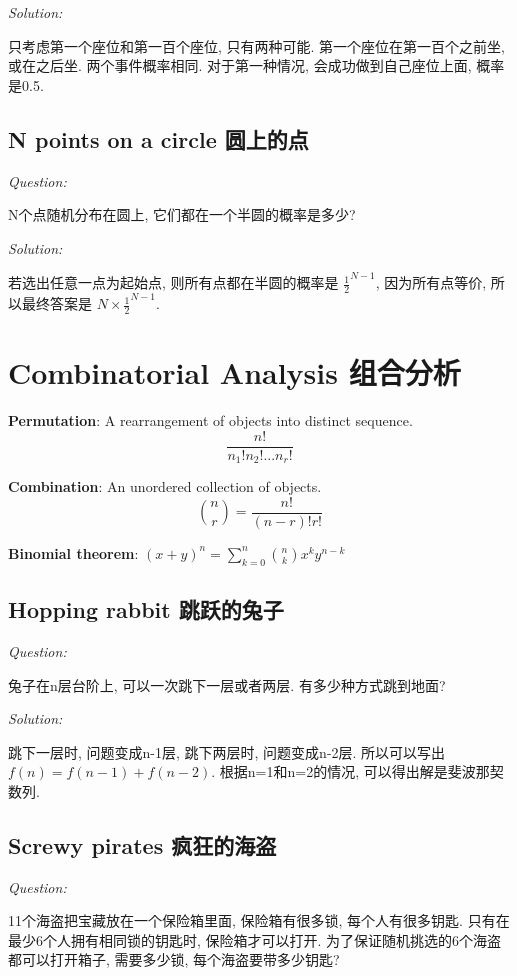 \documentclass[12pt]{book}
\begin{document}
 \noindent \textit{Solution:} 
 
 只考虑第一个座位和第一百个座位, 只有两种可能. 第一个座位在第一百个之前坐, 或在之后坐. 两个事件概率相同. 对于第一种情况, 会成功做到自己座位上面, 概率是0.5.
 
 \subsection{N points on a circle 圆上的点}
\noindent \textit{Question:}


N个点随机分布在圆上, 它们都在一个半圆的概率是多少?

 \noindent \textit{Solution:} 
 
 若选出任意一点为起始点, 则所有点都在半圆的概率是 $\frac{1}{2}^{N-1}$, 因为所有点等价, 所以最终答案是 $N \times \frac{1}{2}^{N-1}$.
 
 \section{Combinatorial Analysis 组合分析}

\textbf{Permutation}: A rearrangement of objects into distinct sequence. $$ \frac{n!}{n_1!n_2!...n_r!}$$

\textbf{Combination}: An unordered collection of objects. 
$$\binom{n}{r}=\frac{n!}{(n-r)!r!}$$

\textbf{Binomial theorem}: $(x+y)^n=\sum_{k=0}^n\binom{n}{k}x^ky^{n-k}$

 \subsection{Hopping rabbit 跳跃的兔子}
\noindent \textit{Question:}

兔子在n层台阶上, 可以一次跳下一层或者两层. 有多少种方式跳到地面?

 \noindent \textit{Solution:} 
 
 跳下一层时, 问题变成n-1层, 跳下两层时, 问题变成n-2层. 所以可以写出 $f(n)=f(n-1)+f(n-2)$. 根据n=1和n=2的情况, 可以得出解是斐波那契数列.
 
  \subsection{Screwy pirates 疯狂的海盗}
\noindent \textit{Question:}

11个海盗把宝藏放在一个保险箱里面, 保险箱有很多锁, 每个人有很多钥匙. 只有在最少6个人拥有相同锁的钥匙时, 保险箱才可以打开. 为了保证随机挑选的6个海盗都可以打开箱子, 需要多少锁, 每个海盗要带多少钥匙?
\end{document}
